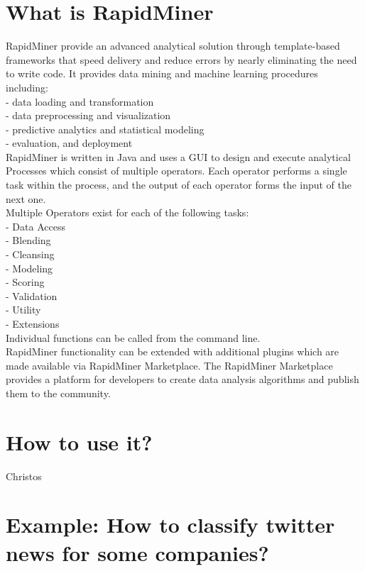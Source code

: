 \documentclass[12pt]{article}
\begin{document}
\section{What is RapidMiner}

RapidMiner provide an advanced analytical solution through template-based frameworks that speed delivery and reduce errors by nearly eliminating the need to write code. It provides data mining and machine learning procedures including: \\

- data loading and transformation \\
- data preprocessing and visualization \\
- predictive analytics and statistical modeling \\
- evaluation, and deployment \\

RapidMiner is written in Java and uses a GUI to design and execute analytical Processes which consist of multiple operators. Each operator performs a single task within the process, and the output of each operator forms the input of the next one. \\

Multiple Operators exist for each of the following tasks: \\
- Data Access\\
- Blending\\
- Cleansing\\
- Modeling\\
- Scoring\\
- Validation\\
- Utility\\
- Extensions\\


Individual functions can be called from the command line. \\

RapidMiner functionality can be extended with additional plugins which are made available via RapidMiner Marketplace. The RapidMiner Marketplace provides a platform for developers to create data analysis algorithms and publish them to the community.


\section{How to use it?}

Christos

\section{Example: How to classify twitter news for some companies?}
\end{document}
